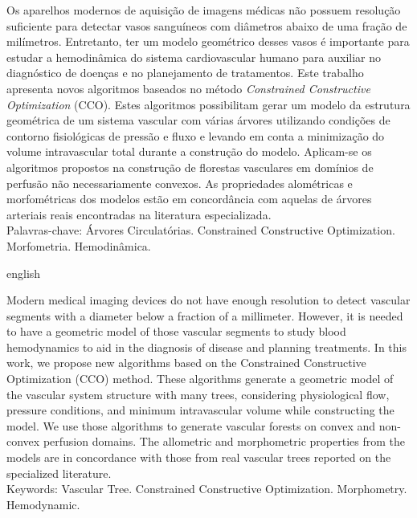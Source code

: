 \documentclass[
  openright,
  english,
  brazil
]{abntbibufjf}
\begin{document}

\begin{resumo}

Os aparelhos modernos de aquisição de imagens médicas não possuem resolução suficiente para 
detectar vasos sanguíneos com diâmetros abaixo de uma fração de milímetros. Entretanto, ter um modelo geométrico
desses vasos é importante para estudar a hemodinâmica do sistema cardiovascular humano 
para auxiliar no diagnóstico de doenças e no planejamento de tratamentos.
Este trabalho apresenta novos algoritmos baseados no método 
\textit{Constrained Constructive Optimization} (CCO). 
Estes algoritmos possibilitam gerar um modelo da estrutura geométrica de um sistema vascular com 
várias árvores utilizando condições de contorno fisiológicas de pressão e fluxo e 
levando em conta a minimização do volume intravascular total durante a construção do modelo.
Aplicam-se os algoritmos propostos na construção de  florestas vasculares em domínios de perfusão 
não necessariamente convexos. As propriedades alométricas e morfométricas dos modelos estão em 
concordância com aquelas de árvores arteriais reais encontradas na literatura especializada.\\[18pt]
Palavras-chave: Árvores Circulatórias. Constrained Constructive Optimization. Morfometria. Hemodinâmica.

\end{resumo}
 
\begin{resumo}[ABSTRACT]
 \begin{otherlanguage*}{english}

Modern medical imaging devices do not have enough resolution to detect vascular 
segments with a diameter below a fraction of a millimeter. However, it is needed to 
have a geometric model of those vascular segments to study blood hemodynamics
to aid in the diagnosis of disease and planning treatments. In this work, we propose 
new algorithms based on the Constrained Constructive Optimization (CCO) method. 
These algorithms generate a geometric model of the vascular system structure 
with many trees, considering physiological flow, pressure conditions, and minimum 
intravascular volume while constructing the model. We use those algorithms to 
generate vascular forests on convex and non-convex perfusion domains. The 
allometric and morphometric properties from the models are in concordance 
with those from real vascular trees reported on the specialized literature.\\[18pt]
Keywords: Vascular Tree. Constrained Constructive Optimization. Morphometry. Hemodynamic.

\end{otherlanguage*}
\end{resumo}
\end{document}
